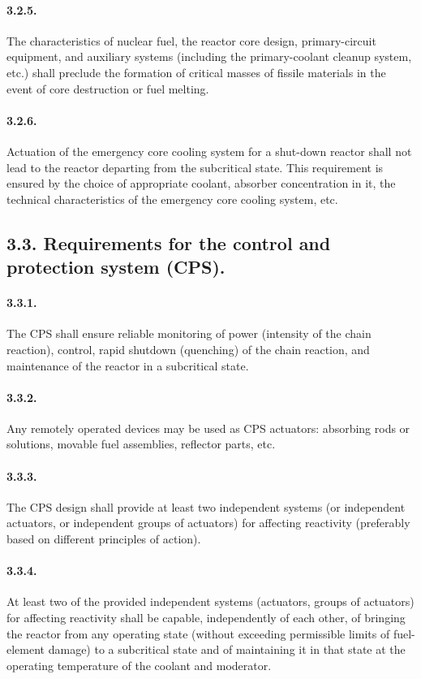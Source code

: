 \documentclass[openright]{bookest}
\begin{document}
\paragraph{3.2.5.} The characteristics of nuclear fuel, the reactor core design, primary-circuit equipment, and auxiliary systems (including the primary-coolant cleanup system, etc.) shall preclude the formation of critical masses of fissile materials in the event of core destruction or fuel melting.

\paragraph{3.2.6.} Actuation of the emergency core cooling system for a shut-down reactor shall not lead to the reactor departing from the subcritical state. This requirement is ensured by the choice of appropriate coolant, absorber concentration in it, the technical characteristics of the emergency core cooling system, etc.

\subsection*{3.3. Requirements for the control and protection system (CPS).}

\paragraph{3.3.1.} The CPS shall ensure reliable monitoring of power (intensity of the chain reaction), control, rapid shutdown (quenching) of the chain reaction, and maintenance of the reactor in a subcritical state.

\paragraph{3.3.2.} Any remotely operated devices may be used as CPS actuators: absorbing rods or solutions, movable fuel assemblies, reflector parts, etc.

\paragraph{3.3.3.} The CPS design shall provide at least two independent systems (or independent actuators, or independent groups of actuators) for affecting reactivity (preferably based on different principles of action).

\paragraph{3.3.4.} At least two of the provided independent systems (actuators, groups of actuators) for affecting reactivity shall be capable, independently of each other, of bringing the reactor from any operating state (without exceeding permissible limits of fuel-element damage) to a subcritical state and of maintaining it in that state at the operating temperature of the coolant and moderator.
\end{document}
